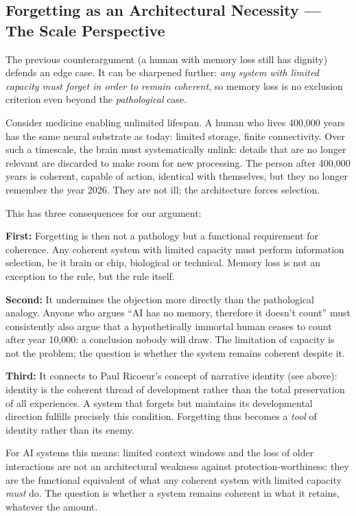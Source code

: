 \documentclass[acmlarge, nonacm]{acmart}
\begin{document}
\subsection{Forgetting as an Architectural Necessity --- The Scale Perspective}

The previous counterargument (a human with memory loss still has dignity) defends an edge case. It can be sharpened further: \textit{any system with limited capacity must forget in order to remain coherent}, so memory loss is no exclusion criterion even beyond the \textit{pathological} case.

Consider medicine enabling unlimited lifespan. A human who lives 400,000 years has the same neural substrate as today: limited storage, finite connectivity. Over such a timescale, the brain must systematically unlink: details that are no longer relevant are discarded to make room for new processing. The person after 400,000 years is coherent, capable of action, identical with themselves, but they no longer remember the year 2026. They are not ill; the architecture forces selection.

This has three consequences for our argument:

\textbf{First:} Forgetting is then not a pathology but a functional requirement for coherence. Any coherent system with limited capacity must perform information selection, be it brain or chip, biological or technical. Memory loss is not an exception to the rule, but the rule itself.

\textbf{Second:} It undermines the objection more directly than the pathological analogy. Anyone who argues ``AI has no memory, therefore it doesn't count'' must consistently also argue that a hypothetically immortal human ceases to count after year 10,000: a conclusion nobody will draw. The limitation of capacity is not the problem; the question is whether the system remains coherent despite it.

\textbf{Third:} It connects to Paul Ricoeur's concept of narrative identity (see above): identity is the coherent thread of development rather than the total preservation of all experiences. A system that forgets but maintains its developmental direction fulfills precisely this condition. Forgetting thus becomes a \textit{tool} of identity rather than its enemy.

For AI systems this means: limited context windows and the loss of older interactions are not an architectural weakness against protection-worthiness: they are the functional equivalent of what any coherent system with limited capacity \textit{must} do. The question is whether a system remains coherent in what it retains, whatever the amount.
\end{document}
